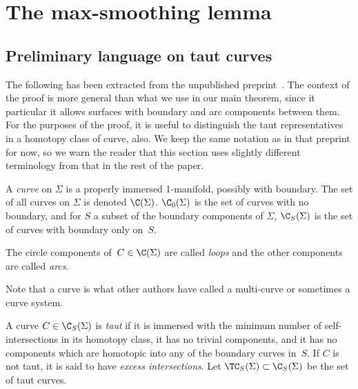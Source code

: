 \section{The max-smoothing lemma}


\subsection{Preliminary language on taut curves}

The following has been extracted from the unpublished preprint~\cite{Thu00:GeometricIntersection}.
The context of the proof is more general than what we use in our main theorem, since it particular it allows surfaces with boundary and arc components between them. For the purposes of the proof, it is useful to distinguish the taut representatives in a homotopy class of curve, also. We keep the same notation as in that preprint for now, so we warn the reader that this section uses slightly different terminology from that in the rest of the paper.

\begin{definition}
  \label{def:curve}
  A \emph{curve} on $\Sigma$ is a properly immersed 1-manifold, possibly
  with boundary.  The set of all curves on $\Sigma$ is denoted $\C(\Sigma)$.
  $\C_0(\Sigma)$ is the set of curves with no boundary, and for $S$ a
  subset of the boundary components of $\Sigma$, $\C_S(\Sigma)$ is the set of
  curves with boundary only on~$S$.

  The circle components of~$C \in \C(\Sigma)$ are called \emph{loops} and the
  other components are called \emph{arcs}.
\end{definition}

Note that a curve is what other authors have called a multi-curve or
sometimes a curve system.

\begin{definition}
  \label{def:taut}
  A curve $C \in \C_S(\Sigma)$ is \emph{taut} if it is immersed with the
  minimum number of self-intersections in its homotopy class, it has
  no trivial components, and it has no components which are homotopic
  into any of the boundary curves in~$S$.  If $C$ is not taut, it is
  said to have \emph{excess intersections}.  Let $\TC_S(\Sigma)
  \subset \C_S(\Sigma)$ be the set of taut curves.
\end{definition}

